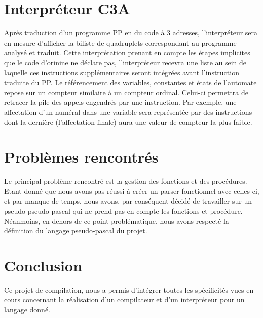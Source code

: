 \documentclass[11pt,a4paper]{article}
\begin{document}
\section{Interpréteur C3A}
Après traduction d'un programme PP en du code à 3 adresses, l'interpréteur sera en mesure d'afficher la biliste de quadruplets correspondant au programme analysé et traduit.
Cette interprétation prenant en compte les étapes implicites que le code d'orinine ne déclare pas, l'interpréteur recevra une liste au sein de laquelle ces instructions supplémentaires seront intégrées avant l'instruction traduite du PP.
Le référencement des variables, constantes et états de l'automate repose sur un compteur similaire à un compteur ordinal.
Celui-ci permettra de retracer la pile des appels engendrés par une instruction.
Par exemple, une affectation d'un numéral dans une variable sera représentée par des instructions dont la dernière (l'affectation finale) aura une valeur de compteur la plus faible.
\pagebreak
\section{Problèmes rencontrés}
Le principal problème rencontré est la gestion des fonctions et des procédures. Etant donné que nous avons pas réussi à créer un parser fonctionnel avec celles-ci, et par manque de temps, nous avons, par conséquent décidé de travailler sur un \og pseudo-pseudo-pascal \fg{} qui ne prend pas en compte les fonctions et procédure. Néanmoins, en dehors de ce point problématique, nous avons respecté la définition du langage pseudo-pascal du projet.
\pagebreak
\section{Conclusion}

Ce projet de compilation, nous a permis d'intégrer toutes les spécificités vues en cours concernant la réalisation d'un compilateur et d'un interpréteur pour un langage donné. 
\end{document}
